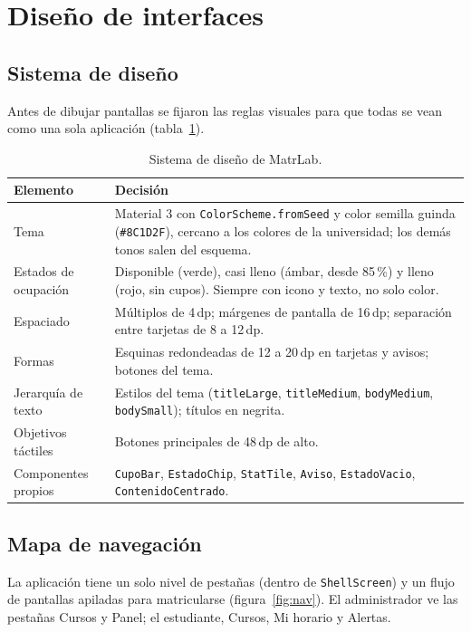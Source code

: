 \section{Diseño de interfaces}
\label{sec:diseno}

\subsection{Sistema de diseño}
Antes de dibujar pantallas se fijaron las reglas visuales para que todas se vean como una sola aplicación (tabla~\ref{tab:sistema}).

\begin{table}[H]
	\centering\footnotesize
	\begin{tabularx}{\textwidth}{|p{3.2cm}|X|}
		\hline
		\rowcolor{tablebackground}\color{white}\textbf{Elemento} & \color{white}\textbf{Decisión}\\
		\hline
		Tema & Material 3 con \texttt{ColorScheme.fromSeed} y color semilla guinda (\texttt{\#8C1D2F}), cercano a los colores de la universidad; los demás tonos salen del esquema. \\\hline
		Estados de ocupación & Disponible (verde), casi lleno (ámbar, desde 85\,\%) y lleno (rojo, sin cupos). Siempre con icono y texto, no solo color. \\\hline
		Espaciado & Múltiplos de 4\,dp; márgenes de pantalla de 16\,dp; separación entre tarjetas de 8 a 12\,dp. \\\hline
		Formas & Esquinas redondeadas de 12 a 20\,dp en tarjetas y avisos; botones del tema. \\\hline
		Jerarquía de texto & Estilos del tema (\texttt{titleLarge}, \texttt{titleMedium}, \texttt{bodyMedium}, \texttt{bodySmall}); títulos en negrita. \\\hline
		Objetivos táctiles & Botones principales de 48\,dp de alto. \\\hline
		Componentes propios & \texttt{CupoBar}, \texttt{EstadoChip}, \texttt{StatTile}, \texttt{Aviso}, \texttt{EstadoVacio}, \texttt{ContenidoCentrado}. \\\hline
	\end{tabularx}
	\caption{Sistema de diseño de MatrLab.}
	\label{tab:sistema}
\end{table}

\subsection{Mapa de navegación}
La aplicación tiene un solo nivel de pestañas (dentro de \texttt{ShellScreen}) y un flujo de pantallas apiladas para matricularse (figura~\ref{fig:nav}). El administrador ve las pestañas Cursos y Panel; el estudiante, Cursos, Mi horario y Alertas.

